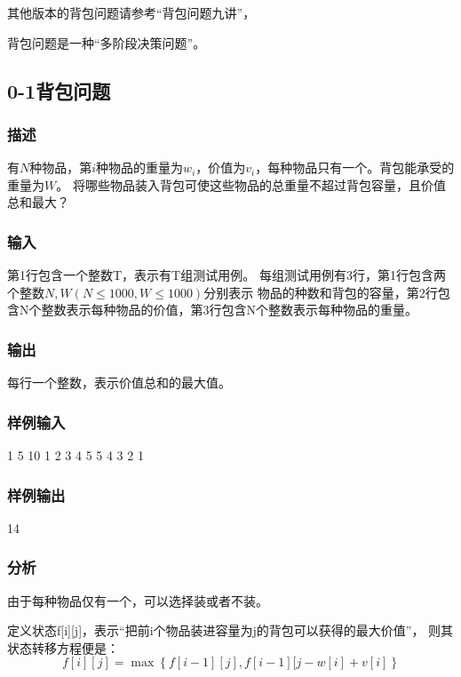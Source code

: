 其他版本的背包问题请参考“背包问题九讲”，

背包问题是一种“多阶段决策问题”。

\subsection{0-1背包问题}

\subsubsection{描述}
有$N$种物品，第$i$种物品的重量为$w_i$，价值为$v_i$，每种物品只有一个。背包能承受的重量为$W$。
将哪些物品装入背包可使这些物品的总重量不超过背包容量，且价值总和最大？

\subsubsection{输入}
第1行包含一个整数T，表示有T组测试用例。
每组测试用例有3行，第1行包含两个整数$N, W(N \leq 1000 , W \leq 1000)$分别表示
物品的种数和背包的容量，第2行包含N个整数表示每种物品的价值，第3行包含N个整数表示每种物品的重量。

\subsubsection{输出}
每行一个整数，表示价值总和的最大值。

\subsubsection{样例输入}
\begin{Code}
1
5 10
1 2 3 4 5
5 4 3 2 1
\end{Code}

\subsubsection{样例输出}
\begin{Code}
14
\end{Code}

\subsubsection{分析}
由于每种物品仅有一个，可以选择装或者不装。

定义状态f[i][j]，表示“把前i个物品装进容量为j的背包可以获得的最大价值”，
则其状态转移方程便是：
$$f[i][j]=\max\left\{f[i-1][j], f[i-1][j-w[i]+v[i]\right\}$$

